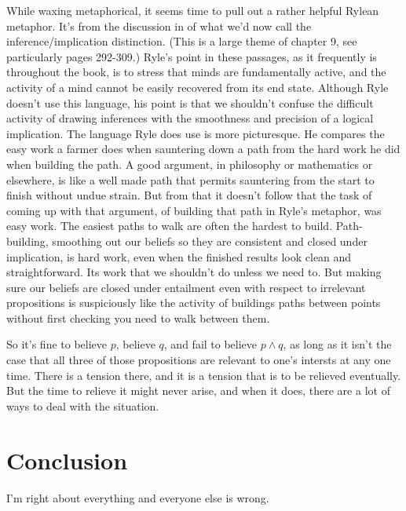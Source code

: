 \documentclass[11pt,]{book}
\begin{document}
While waxing metaphorical, it seems time to pull out a rather helpful Rylean metaphor. It's from the discussion in \citet{Ryle1949} of what we'd now call the inference/implication distinction. (This is a large theme of chapter 9, see particularly pages 292-309.) Ryle's point in these passages, as it frequently is throughout the book, is to stress that minds are fundamentally active, and the activity of a mind cannot be easily recovered from its end state. Although Ryle doesn't use this language, his point is that we shouldn't confuse the difficult activity of drawing inferences with the smoothness and precision of a logical implication. The language Ryle does use is more picturesque. He compares the easy work a farmer does when sauntering down a path from the hard work he did when building the path. A good argument, in philosophy or mathematics or elsewhere, is like a well made path that permits sauntering from the start to finish without
undue strain. But from that it doesn't follow that the task of coming up with that argument, of building that path in Ryle's metaphor, was easy work. The easiest paths to walk are often the hardest to build. Path-building, smoothing out our beliefs so they are consistent and closed under implication, is hard work, even when the finished results look clean and straightforward. Its work that we shouldn't do unless we need to. But making sure our beliefs are closed under entailment even with respect to irrelevant propositions is suspiciously like the
activity of buildings paths between points without first checking you need to walk between them.

So it's fine to believe \(p\), believe \(q\), and fail to believe \(p \wedge q\), as long as it isn't the case that all three of those propositions are relevant to one's intersts at any one time. There is a tension there, and it is a tension that is to be relieved eventually. But the time to relieve it might never arise, and when it does, there are a lot of ways to deal with the situation.

\hypertarget{conclusion}{%
\chapter{Conclusion}\label{conclusion}}

I'm right about everything and everyone else is wrong.


\end{document}
